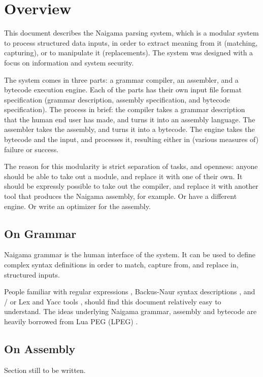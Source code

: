 \section{Overview}

This document describes the Naigama parsing system, which is a 
modular system to process structured data inputs, in order to extract
meaning from it (matching, capturing), or to manipulate it (replacements).
The system was designed with a focus on information and system security.

The system comes in three parts: a grammar compiler, an assembler,
and a bytecode execution engine. Each of the parts has their own
input file format specification (grammar description, assembly specification,
and bytecode specification). The process in brief: the compiler takes a
grammar description that the human end user has made, and turns it into
an assembly language. The assembler takes the assembly, and turns it
into a bytecode. The engine takes the bytecode and the input, and
processes it, resulting either in (various measures of) failure or
success.

The reason for this modularity is strict separation of tasks, and openness:
anyone should be able to take out a module, and replace it with one
of their own.
It should be expressly possible to take out the compiler, and replace
it with another tool that produces the Naigama assembly, for example.
Or have a different engine. Or write an optimizer for the assembly.

\subsection{On Grammar}
  
Naigama grammar is the human interface of the system.
It can be used to define complex syntax definitions in order
to match, capture from, and replace in, structured inputs.

People familiar with regular expressions \cite{bib:regex},
Backus-Naur syntax descriptions \cite{bib:backusnaur},
and / or Lex and Yacc tools \cite{bib:yacc},
should find this document relatively easy to understand.
The ideas underlying Naigama grammar, assembly and bytecode
are heavily borrowed from Lua PEG (LPEG) \cite{bib:peg}.

\subsection{On Assembly}

Section still to be written.


